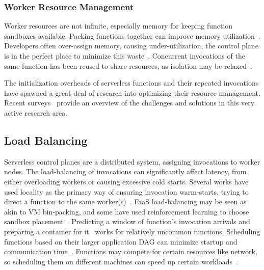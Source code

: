 \subsubsection{Worker Resource Management}
Worker resources are not infinite, especially memory for keeping function sandboxes available.
Packing functions together can improve memory utilization~\cite{akhtar_cose_2020}.
Developers often over-assign memory, causing under-utilization, the control plane is in the perfect place to minimize this waste~\cite{eismann2021sizeless, mvondo2021ofc}.
Concurrent invocations of the same function has been reused to share resources, as isolation may be relaxed~\cite{stojkovic2023mxfaas}.

The initialization overheads of serverless functions and their repeated invocations have spawned a great deal of research into optimizing their resource management.
Recent surveys~\cite{faas-survey-jan-2022, raza2021sok, eismann2020serverless, hassan2021survey, mampage2021holistic} provide an overview of the challenges and solutions in this very active research area. 

\subsection{Load Balancing}

Serverless control planes are a distributed system, assigning invocations to worker nodes.
The load-balancing of invocations can significantly affect latency, from either overloading workers or causing excessive cold starts. 
Several works have used locality as the primary way of ensuring invocation warm-starts, trying to direct a function to the same worker(s)~\cite{package-cristina-19, leegreedy}.
FaaS load-balancing may be seen as akin to VM bin-packing, and some have used reinforcement learning to choose sandbox placement~\cite{balaji2021fireplace}.
Predicting a window of function's invocation arrivals and preparing a container for it~\cite{shahrad2020serverless} works for relatively uncommon functions.
Scheduling functions based on their larger application DAG can minimize startup and communication time~\cite{shen2021defuse, abdi2023palette, guo_decomposing_2022, kotni2021faastlane, shen_defuse_2021,mahgoub_wisefuse_2022,zhou_qos-aware_2022}.
Functions may compete for certain resources like network, so scheduling them on different machines can speed up certain workloads~\cite{tian_owl_2022}.

